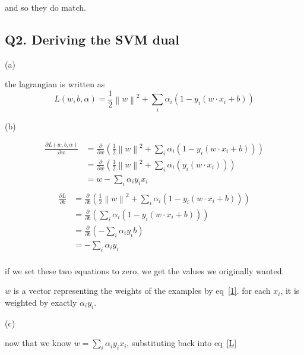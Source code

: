 \documentclass{report}
\begin{document}
and so they do match.


\newpage

\subsection*{Q2. Deriving the SVM dual}
(a)

the lagrangian is written as 
\begin{equation}\label{L}
    L(w,b,\alpha) = \frac{1}{2}\left\|w\right\|^2 + \sum_i \alpha_i(1-y_i(w\cdot x_i + b))
\end{equation}


(b)

\begin{equation}\label{1}
    \begin{split}
        \frac{\partial L(w,b,\alpha)}{\partial w} &= \frac{\partial }{\partial w}\left( \frac{1}{2}\left\|w\right\|^2 + \sum_i \alpha_i(1-y_i(w\cdot x_i + b)) \right)\\
        &= \frac{\partial }{\partial w}\left( \frac{1}{2}\left\|w\right\|^2 + \sum_i \alpha_i(y_i(w\cdot x_i )) \right)\\
        &= w - \sum_i \alpha_iy_ix_{i}\\
    \end{split}
\end{equation}
\begin{equation}
    \begin{split}
        \frac{\partial L}{\partial b}&= \frac{\partial}{\partial b}\left( \frac{1}{2}\left\|w\right\|^2 + \sum_i \alpha_i(1-y_i(w\cdot x_i + b)) \right)\\
        &= \frac{\partial}{\partial b}\left( \sum_i \alpha_i(1-y_i(w\cdot x_i + b)) \right)\\
        &= \frac{\partial}{\partial b} \left( -\sum_i \alpha_iy_ib \right)\\
        &= -\sum_i \alpha_iy_i\\
    \end{split}
\end{equation}

if we set these two equations to zero, we get the values we originally wanted. 

\(w\) is a vector representing the weights of the examples by eq~\ref{1}. for each \(x_i\), it is weighted by exactly \(\alpha_i y_i\).


(c)

now that we know \(w=\sum_i \alpha_iy_ix_i\), substituting back into eq~\ref{L}
\end{document}
